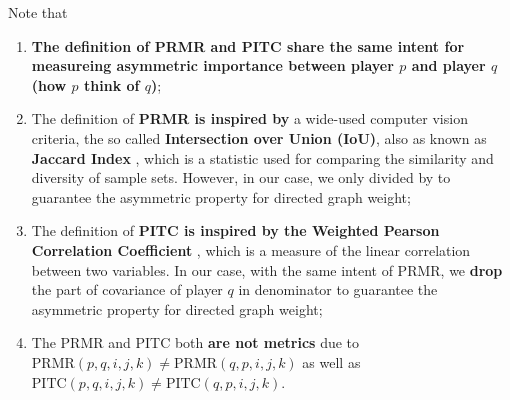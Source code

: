 Note that

\begin{enumerate}
\item \textbf{The definition of PRMR and PITC share the same intent for measureing asymmetric importance  
      between player $p$ and player $q$ (how $p$ think of $q$)};
\item The definition of \textbf{PRMR is inspired by} a wide-used computer vision criteria, the so called \textbf{Intersection over Union (IoU)}, 
      also as known as \textbf{Jaccard Index} \cite{real1996probabilistic, jaccard1901etude},
      which is a statistic used for comparing the similarity and diversity of sample sets. 
      However, in our case, we only divided by to guarantee the asymmetric property for directed graph weight;
\item The definition of \textbf{PITC is inspired by the Weighted Pearson Correlation Coefficient} \cite{pearson1895note},
      which is a measure of the linear correlation between two variables. In our case, with the same intent of PRMR, 
      we \textbf{drop} the
      part of covariance of player $q$ in denominator to guarantee the asymmetric property for directed graph weight; 
\item The PRMR and PITC both \textbf{are not metrics} due to $\text{PRMR}(p, q, i, j, k) \neq \text{PRMR}(q, p, i, j, k)$ as well as
$\text{PITC}(p, q, i, j, k) \neq \text{PITC}(q, p, i, j, k)$.
\end{enumerate}

